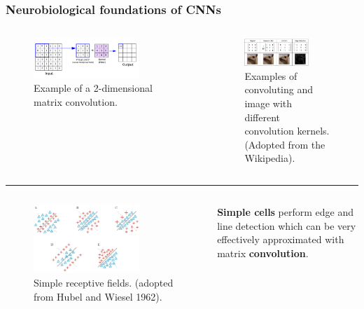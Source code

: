 \documentclass[a4paper,9pt]{beamer}
\theoremstyle{mytheoremstyle}
\begin{document}
\begin{frame}
\frametitle{Neurobiological foundations of CNNs}
\begin{columns}
\begin{figure}
\begin{center}
  \includegraphics[width=0.75\textwidth]{res/convolution.png}
\end{center}
	\caption{Example of a 2-dimensional matrix convolution.}
\end{figure}
\begin{figure}
\begin{center}
  \includegraphics[width=0.75\textwidth]{res/convolution_kernels_examples.png}
\end{center}
	\caption{Examples of convoluting and image with different convolution kernels. (Adopted from the Wikipedia).}
\end{figure}
\end{columns}
\hrule
\begin{columns}
\begin{figure}
\begin{center}
  \includegraphics[width=0.75\textwidth]{res/simple_cells.png}
\end{center}
	\caption{Simple receptive fields. (adopted from Hubel and Wiesel 1962).}
\end{figure}
\vspace{0.7cm}
\scriptsize{
\begin{exampleblock}{}
\textbf{Simple cells} perform edge and line detection which can be very effectively approximated with matrix \textbf{convolution}.
\end{exampleblock}
}
\end{columns}
\end{frame}
\end{document}
